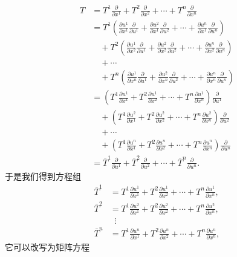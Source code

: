 \begin{align*}
T&=T^1\frac{\partial}{\partial x^1}+T^2\frac{\partial}{\partial x^2}+\cdots+T^n\frac{\partial}{\partial x^n}\\
&=T^1\left(\frac{\partial u^1}{\partial x^1}\frac{\partial}{\partial u^1}+\frac{\partial u^2}{\partial x^1}\frac{\partial}{\partial u^2}+\cdots+\frac{\partial u^n}{\partial x^1}\frac{\partial}{\partial u^n}\right)\\
&\quad+T^2\left(\frac{\partial u^1}{\partial x^2}\frac{\partial}{\partial u^1}+\frac{\partial u^2}{\partial x^2}\frac{\partial}{\partial u^2}+\cdots+\frac{\partial u^n}{\partial x^2}\frac{\partial}{\partial u^n}\right)\\
&\quad+\cdots\\
&\quad+T^n\left(\frac{\partial u^1}{\partial x^n}\frac{\partial}{\partial u^1}+\frac{\partial u^2}{\partial x^n}\frac{\partial}{\partial u^2}+\cdots+\frac{\partial u^n}{\partial x^n}\frac{\partial}{\partial u^n}\right)\\
&=\left(T^1\frac{\partial u^1}{\partial x^1}+T^2\frac{\partial u^1}{\partial x^2}+\cdots+T^n\frac{\partial u^1}{\partial x^n}\right)\frac{\partial}{\partial u^1}\\
&\quad+\left(T^1\frac{\partial u^2}{\partial x^1}+T^2\frac{\partial u^2}{\partial x^2}+\cdots+T^n\frac{\partial u^2}{\partial x^n}\right)\frac{\partial}{\partial u^2}\\
&\quad+\cdots\\
&\quad+\left(T^1\frac{\partial u^n}{\partial x^1}+T^2\frac{\partial u^n}{\partial x^2}+\cdots+T^n\frac{\partial u^n}{\partial x^n}\right)\frac{\partial}{\partial u^n}\\
&=\bar{T}^1\frac{\partial}{\partial u^1}+\bar{T}^2\frac{\partial}{\partial u^2}+\cdots+\bar{T}^n\frac{\partial}{\partial u^n}.
\end{align*}
于是我们得到方程组
\begin{align*}
\bar{T}^1&=T^1\frac{\partial u^1}{\partial x^1}+T^2\frac{\partial u^1}{\partial x^2}+\cdots+T^n\frac{\partial u^1}{\partial x^n},\\
\bar{T}^2&=T^1\frac{\partial u^2}{\partial x^1}+T^2\frac{\partial u^2}{\partial x^2}+\cdots+T^n\frac{\partial u^2}{\partial x^n},\\
&\;\;\vdots\\
\bar{T}^n&=T^1\frac{\partial u^n}{\partial x^1}+T^2\frac{\partial u^n}{\partial x^2}+\cdots+T^n\frac{\partial u^n}{\partial x^n},
\end{align*}
它可以改写为矩阵方程
